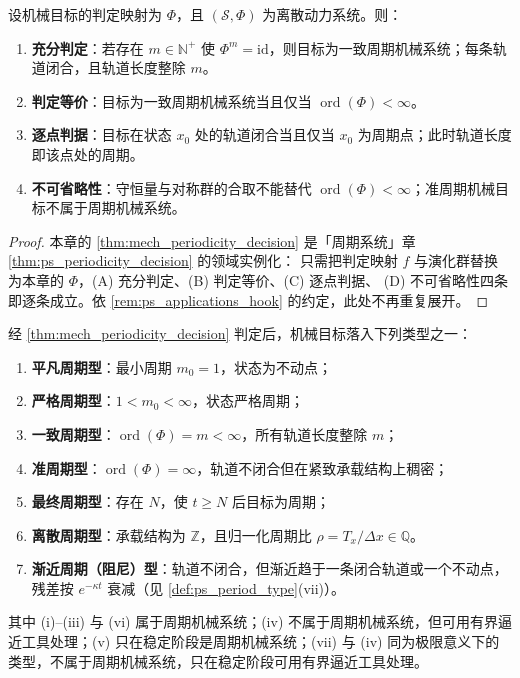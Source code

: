 \begin{theorem}[机械周期性判定定理]\label{thm:mech_periodicity_decision}
设机械目标的判定映射为 $\Phi$，且 $(\mathcal S,\Phi)$ 为离散动力系统。则：
\begin{enumerate}[label=(\Alph*)]
    \item \textbf{充分判定}：若存在 $m\in\mathbb N^+$ 使 $\Phi^m=\mathrm{id}$，则目标为一致周期机械系统；每条轨道闭合，且轨道长度整除 $m$。
    \item \textbf{判定等价}：目标为一致周期机械系统当且仅当 $\operatorname{ord}(\Phi)<\infty$。
    \item \textbf{逐点判据}：目标在状态 $x_0$ 处的轨道闭合当且仅当 $x_0$ 为周期点；此时轨道长度即该点处的周期。
    \item \textbf{不可省略性}：守恒量与对称群的合取不能替代 $\operatorname{ord}(\Phi)<\infty$；准周期机械目标不属于周期机械系统。
\end{enumerate}
\end{theorem}

\begin{proof}
本章的 \cref{thm:mech_periodicity_decision} 是「周期系统」章 \cref{thm:ps_periodicity_decision} 的领域实例化：
只需把判定映射 $f$ 与演化群替换为本章的 $\Phi$，(A) 充分判定、(B) 判定等价、(C) 逐点判据、
(D) 不可省略性四条即逐条成立。依 \cref{rem:ps_applications_hook} 的约定，此处不再重复展开。
\end{proof}

\begin{corollary}[机械周期类型]\label{cor:mech_period_type}
经 \cref{thm:mech_periodicity_decision} 判定后，机械目标落入下列类型之一：
\begin{enumerate}[label=(\roman*)]
    \item \textbf{平凡周期型}：最小周期 $m_0=1$，状态为不动点；
    \item \textbf{严格周期型}：$1<m_0<\infty$，状态严格周期；
    \item \textbf{一致周期型}：$\operatorname{ord}(\Phi)=m<\infty$，所有轨道长度整除 $m$；
    \item \textbf{准周期型}：$\operatorname{ord}(\Phi)=\infty$，轨道不闭合但在紧致承载结构上稠密；
    \item \textbf{最终周期型}：存在 $N$，使 $t\ge N$ 后目标为周期；
    \item \textbf{离散周期型}：承载结构为 $\mathbb Z$，且归一化周期比 $\rho=T_x/\Delta x\in\mathbb Q$。
    \item \textbf{渐近周期（阻尼）型}：轨道不闭合，但渐近趋于一条闭合轨道或一个不动点，残差按 $e^{-\kappa t}$ 衰减（见 \cref{def:ps_period_type}(vii)）。
\end{enumerate}
其中 (i)--(iii) 与 (vi) 属于周期机械系统；(iv) 不属于周期机械系统，但可用有界逼近工具处理；(v) 只在稳定阶段是周期机械系统；(vii) 与 (iv) 同为极限意义下的类型，不属于周期机械系统，只在稳定阶段可用有界逼近工具处理。
\end{corollary}

